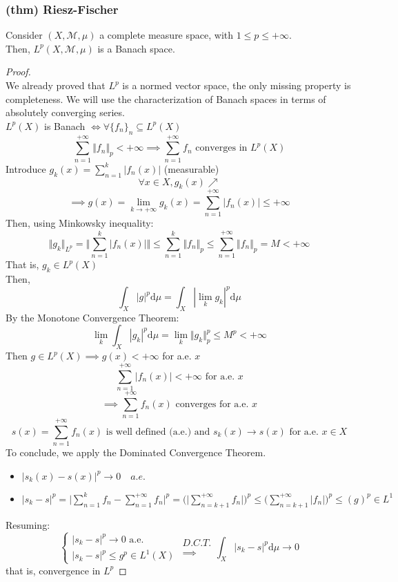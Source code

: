 \subsubsection{(thm) Riesz-Fischer}
Consider $(X,\mathcal{M},\mu)$ a complete measure space, with $1\leq p\leq +\infty$.\\
Then, $L^p(X,\mathcal M,\mu)$ is a Banach space.
\begin{proof}\ \\
    We already proved that $L^p$ is a normed vector space, the only missing property is completeness. We will use the characterization of Banach spaces in terms of absolutely converging series.\\
    $L^p(X)$ is Banach $\iff \forall \{f_n\}_n\subseteq L^p(X)$
    $$\sum_{n=1}^{+\infty}\Vert f_n\Vert_p<+\infty\implies \sum_{n=1}^{+\infty} f_n \text{ converges in }L^p(X)$$
    Introduce $g_k(x)=\sum_{n=1}^k|f_n(x)|$ (measurable)\\
            $$\forall x\in X, g_k(x)\nearrow$$
$$\implies g(x)=\lim_{k\to +\infty}g_k(x)=\sum_{n=1}^{+\infty}|f_n(x)|\leq +\infty$$
    Then, using Minkowsky inequality: 
    $$\Vert g_k\Vert_{L^p}=\Big \Vert\sum_{n=1}^k|f_n(x)| \Big\Vert\leq \sum_{n=1}^k\Vert f_n\Vert_p\leq\sum_{n=1}^{+\infty}\Vert f_n\Vert_p=M<+\infty$$
    That is, $g_k\in L^p(X)$\\
    Then, 
    $$\int_X|g|^p\mathrm d\mu=\int_X|\lim_k g_k|^p\mathrm d\mu$$
    By the Monotone Convergence Theorem:
    $$\lim_k\int_X|g_k|^p\mathrm d\mu=\lim_k\Vert g_k\Vert_p^p\leq M^p<+\infty$$
    Then $g\in L^p(X)\implies g(x)<+\infty$ for a.e. $x$
    $$\sum_{n=1}^{+\infty} |f_n(x)|<+\infty\text{ for a.e. }x$$
    $$\implies \sum_{n=1}^{+\infty}f_n(x)\text{ converges for a.e. }x$$
    $$s(x)=\sum_{n=1}^{+\infty}f_n(x)\text{ is well defined (a.e.) and }s_k(x)\to s(x) \text{ for a.e. }x\in X$$
    To conclude, we apply the Dominated Convergence Theorem.
    \begin{itemize}
        \item $|s_k(x)-s(x)|^p\to 0\quad a.e.$
        \item $|s_k-s|^p=\Big |\sum_{n=1}^kf_n-\sum_{n=1}^{+\infty}f_n\Big |^p = \Big(\Big |\sum_{n=k+1}^{+\infty}f_n\Big|\Big)^p\leq\Big (\sum_{n=k+1}^{+\infty}|f_n|\Big )^p\leq (g)^p\in L^1$
    \end{itemize}    
    Resuming:
    $$\begin{cases}
        |s_k-s|^p\to0\text{ a.e.}\\
        |s_k-s|^p\leq g^p\in L^1(X)
    \end{cases}\substack{D.C.T.\\ \implies} \int_X |s_k-s|^p\mathrm d\mu\to 0$$
 that is, convergence in $L^p$
    
\end{proof}
